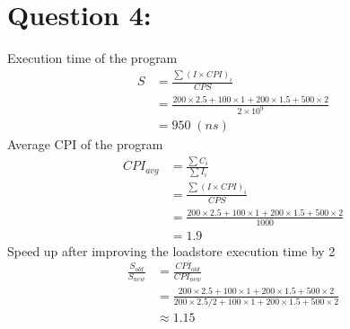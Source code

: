 \documentclass[12pt,a4paper]{article}
\begin{document}
\section*{Question 4:}
Execution time of the program
\begin{align*}
  S & = \frac{\sum {(I \times CPI)}_i}{CPS}                                                 \\
    & = \frac{200 \times 2.5 + 100 \times 1 + 200 \times 1.5 + 500 \times 2}{2 \times 10^9} \\
    & = 950\;(ns)
\end{align*}
Average CPI of the program
\begin{align*}
  CPI_{avg} & = \frac{\sum C_i}{\sum I_i}                                                  \\
            & = \frac{\sum {(I \times CPI)}_i}{CPS}                                        \\
            & = \frac{200 \times 2.5 + 100 \times 1 + 200 \times 1.5 + 500 \times 2}{1000} \\
            & = 1.9
\end{align*}
Speed up after improving the loadstore execution time by 2
\begin{align*}
  \frac{S_{old}}{S_{new}} & = \frac{CPI_{old}}{CPI_{new}}                                                                                                             \\
                          & = \frac{200 \times 2.5 + 100 \times 1 + 200 \times 1.5 + 500 \times 2}{200 \times 2.5 / 2 + 100 \times 1 + 200 \times 1.5 + 500 \times 2} \\
                          & \approx 1.15
\end{align*}

\end{document}
